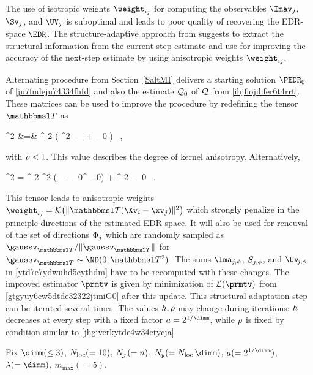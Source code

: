 \label{SEDRsa}
The use of isotropic weights \( \weight_{ij} \) for computing the observables 
\( \Imav_{j} \), \( \Sv_{j} \), and \( \UV_{j} \) is suboptimal and leads to poor 
quality of recovering the EDR-space \( \EDR \).
The structure-adaptive approach from \cite{HJPS} suggests to extract the structural information from the current-step estimate 
and use for improving the accuracy of the next-step estimate by using 
anisotropic weights \( \weight_{ij} \).

Alternating procedure from Section~\ref{SaltMI} delivers 
a starting solution \( \PEDR_{0} \) of \eqref{ju7fudeju74334fhfd} and also the estimate \( \mathcal{Q}_{0} \) of \( \mathcal{Q} \)
from \eqref{ihjfiojihfer6t4rrt}.
These matrices can be used to improve the procedure by redefining the tensor \( \TEDR \) as
\begin{EQA}
	\TEDR^{2}
	&=&
	\hiso^{-2} \bigl( \aniso^{2} \, \Id_{\dimd} + \JEDR_{0} \bigr)
	\, ,
\label{yfijowjdo76dvuienk}
\end{EQA}
with \( \rho < 1 \).
This value describes the degree of kernel anisotropy.
Alternatively, %
\begin{EQA}[c]
	\TEDR^{2}
	=
	\hiso^{-2} \aniso^{2} (\Id_{\dimd} - \PEDR_{0}^{\T} \PEDR_{0}) + \hiso^{-2} \, \JEDR_{0}
	\, .
\end{EQA}
This tensor leads to anisotropic weights 
\( \weight_{ij} = \Kern\bigl( \| \TEDR(\Xv_{i} - \xv_{j}) \|^{2} \bigr) \)
which strongly penalize in the principle directions of the estimated EDR space.
It will also be used for reneuval of the set of directions \( \Phi_{j} \) which are randomly sampled as
\( \gaussv_{\TEDR}/\| \gaussv_{\TEDR} \| \) for \( \gaussv_{\TEDR} \sim \ND(0,\TEDR^{2}) \). 
The sums \( \Ima_{j,\sph} \), \( S_{j,\phi} \), and \( \Uv_{\jm,\sph} \) in \eqref{ytd7e7ydwuhd5eythdm}
have to be recomputed with these changes.
The improved estimator \( \tilde{\prmtv} \) is given by 
minimization of \( \LL(\prmtv) \) from \eqref{gtgyuy6ew5dtde32322jtmiG0}
after this update.
%
This structural adaptation step can be iterated several times.
The values \( h, \rho \) may change during iterations: 
\( h \) decreases at every step with a fixed factor 
\( a = 2^{1/\dimm} \), while \( \rho \) is fixed by condition similar to \eqref{jhgiverkytde4w34etycja}.


\label{SEDRmiproc}
Fix 
\( \dimm (\leq 3) \), 
\( N_{\operatorname{loc}} (= 10) \), 
\( N_{\!_{\mathcal{J}}} (= n) \), 
\( \nSph (= \nmin \, \dimm) \),
\( a (= 2^{1/\dimm}) \), 
\( \lambda (= \dimm) \),
\( m_{\max} (= 5) \).

